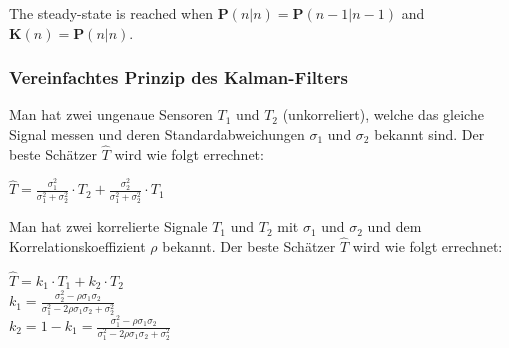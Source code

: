 The steady-state is reached when $\mathbf{P}(n|n) = \mathbf{P}(n-1 | n-1)$ and $\mathbf{K}(n) = \mathbf{P}(n|n)$.

\subsubsection{Vereinfachtes Prinzip des Kalman-Filters}
\begin{minipage}{14.5cm}
Man hat zwei ungenaue Sensoren $T_1$ und $T_2$ (unkorreliert), welche das gleiche Signal messen und deren Standardabweichungen $\sigma_1$ und $\sigma_2$ bekannt sind. Der beste
Schätzer $\hat{T}$ wird wie folgt errechnet:\\
\end{minipage}
\hspace{0.25cm}
\begin{minipage}{5cm}
$\hat{T}=\frac{\sigma_1^2}{\sigma_1^2+\sigma_2^2}\cdot T_2+\frac{\sigma_2^2}{\sigma_1^2+\sigma_2^2}\cdot T_1$
\end{minipage}
\begin{minipage}{14.5cm}
Man hat zwei korrelierte Signale $T_1$ und $T_2$ mit $\sigma_1$ und $\sigma_2$ und dem Korrelationskoeffizient $\rho$ bekannt. Der beste
Schätzer $\hat{T}$ wird wie folgt errechnet:\\
\end{minipage}
\hspace{0.25cm}
\begin{minipage}{5cm}
$\hat{T}=k_1\cdot T_1 + k_2\cdot T_2$\\
$k_1=\frac{\sigma_2^2-\rho \sigma_1 \sigma_2}{\sigma_1^2 - 2 \rho \sigma_1 \sigma_2 + \sigma_2^2}$\\
$k_2=1-k_1=\frac{\sigma_1^2-\rho \sigma_1 \sigma_2}{\sigma_1^2 - 2 \rho \sigma_1 \sigma_2 + \sigma_2^2}$\\
\end{minipage}
